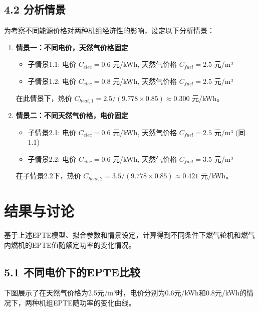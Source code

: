 \documentclass[12pt]{ctexart}
\begin{document}
\subsection{4.2 分析情景}
为考察不同能源价格对两种机组经济性的影响，设定以下分析情景：
\begin{enumerate}
    \item \textbf{情景一：不同电价，天然气价格固定}
    \begin{itemize}
        \item 子情景1.1: 电价 $C_{elec} = 0.6$ 元/kWh, 天然气价格 $C_{fuel} = 2.5$ 元/m³
        \item 子情景1.2: 电价 $C_{elec} = 0.8$ 元/kWh, 天然气价格 $C_{fuel} = 2.5$ 元/m³
    \end{itemize}
    在此情景下，热价 $C_{heat,1} = 2.5 / (9.778 \times 0.85) \approx 0.300$ 元/kWh。

    \item \textbf{情景二：不同天然气价格，电价固定}
    \begin{itemize}
        \item 子情景2.1: 电价 $C_{elec} = 0.6$ 元/kWh, 天然气价格 $C_{fuel} = 2.5$ 元/m³ (同1.1)
        \item 子情景2.2: 电价 $C_{elec} = 0.6$ 元/kWh, 天然气价格 $C_{fuel} = 3.5$ 元/m³
    \end{itemize}
    在子情景2.2下，热价 $C_{heat,2} = 3.5 / (9.778 \times 0.85) \approx 0.421$ 元/kWh。
\end{enumerate}

\section{结果与讨论}
基于上述EPTE模型、拟合参数和情景设定，计算得到不同条件下燃气轮机和燃气内燃机的EPTE值随额定功率的变化情况。

\subsection{5.1 不同电价下的EPTE比较}
下图展示了在天然气价格为2.5元/m³时，电价分别为0.6元/kWh和0.8元/kWh的情况下，两种机组EPTE随功率的变化曲线。
\end{document}
